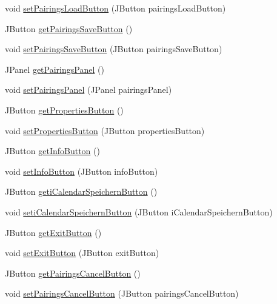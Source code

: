 \begin{DoxyCompactItemize}
void \hyperlink{classde_1_1turnierverwaltung_1_1view_1_1_navi_view_af5297943b8f68b1423763b14d705d08e}{set\+Pairings\+Load\+Button} (J\+Button pairings\+Load\+Button)
\item 
J\+Button \hyperlink{classde_1_1turnierverwaltung_1_1view_1_1_navi_view_a07c098a5a95067f5b0129b703e0a5a4d}{get\+Pairings\+Save\+Button} ()
\item 
void \hyperlink{classde_1_1turnierverwaltung_1_1view_1_1_navi_view_a7efa145836c397d65f25648d46c6f681}{set\+Pairings\+Save\+Button} (J\+Button pairings\+Save\+Button)
\item 
J\+Panel \hyperlink{classde_1_1turnierverwaltung_1_1view_1_1_navi_view_a25e233e8ba45d0d3642ebf431839b3c9}{get\+Pairings\+Panel} ()
\item 
void \hyperlink{classde_1_1turnierverwaltung_1_1view_1_1_navi_view_a2e407790b73dea3770e67292417f5483}{set\+Pairings\+Panel} (J\+Panel pairings\+Panel)
\item 
J\+Button \hyperlink{classde_1_1turnierverwaltung_1_1view_1_1_navi_view_a57f6f4f574e00fd213ec7de71cbe155b}{get\+Properties\+Button} ()
\item 
void \hyperlink{classde_1_1turnierverwaltung_1_1view_1_1_navi_view_a142c4e3d7ac2ba75428ee90d473637fb}{set\+Properties\+Button} (J\+Button properties\+Button)
\item 
J\+Button \hyperlink{classde_1_1turnierverwaltung_1_1view_1_1_navi_view_a60b5917884dc78668421a0392668dffb}{get\+Info\+Button} ()
\item 
void \hyperlink{classde_1_1turnierverwaltung_1_1view_1_1_navi_view_a8a33603c4c6fad2efea6e08167f8687c}{set\+Info\+Button} (J\+Button info\+Button)
\item 
J\+Button \hyperlink{classde_1_1turnierverwaltung_1_1view_1_1_navi_view_a512881a809d837d250c99cadf9625a9d}{geti\+Calendar\+Speichern\+Button} ()
\item 
void \hyperlink{classde_1_1turnierverwaltung_1_1view_1_1_navi_view_affffc12f6d3636e90c2c06a4c9e7c0a0}{seti\+Calendar\+Speichern\+Button} (J\+Button i\+Calendar\+Speichern\+Button)
\item 
J\+Button \hyperlink{classde_1_1turnierverwaltung_1_1view_1_1_navi_view_a115c742827e38aee03b6122894dec41f}{get\+Exit\+Button} ()
\item 
void \hyperlink{classde_1_1turnierverwaltung_1_1view_1_1_navi_view_af90bfedeaee059cedafa7db9ce6b4638}{set\+Exit\+Button} (J\+Button exit\+Button)
\item 
J\+Button \hyperlink{classde_1_1turnierverwaltung_1_1view_1_1_navi_view_a4f91913b109ca92d897e73ec29663649}{get\+Pairings\+Cancel\+Button} ()
\item 
void \hyperlink{classde_1_1turnierverwaltung_1_1view_1_1_navi_view_a9f74f40548437665d1a456917407cd14}{set\+Pairings\+Cancel\+Button} (J\+Button pairings\+Cancel\+Button)
\end{DoxyCompactItemize}



